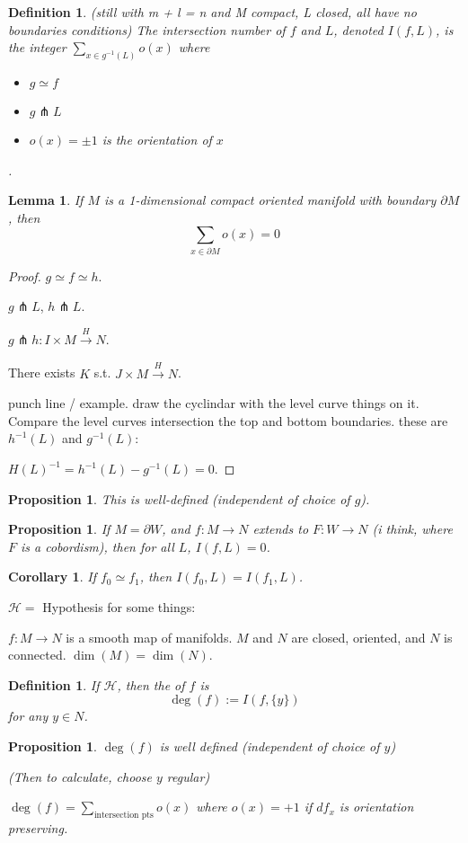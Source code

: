 \documentclass[11pt]{amsbook}
\newenvironment{dateenv}{
	\vspace{1em}
}{
	\vspace{1em}
}
\newcommand{\mydate}[4]{
	\newdate{#1}{#2}{#3}{#4}
	\begin{dateenv}
		\hfill\displaydate{#1}
	\end{dateenv}
}
\theoremstyle{mystyle} \newtheorem{thrm}[thm]{Theorem}
\theoremstyle{mystyle} \newtheorem{defi}[thm]{Definition}
\theoremstyle{mystyle} \newtheorem{coro}[thm]{Corollary}
\theoremstyle{mystyle} \newtheorem{propo}[thm]{Proposition}
\theoremstyle{mystyle} \newtheorem{lemm}[thm]{Lemma}
\numberwithin{thm}{section}
\newcommand{\homotopic}{\simeq}
\renewcommand{\d}{\partial}
\newcommand{\transverse}{\pitchfork}
\newcommand{\x}{\times}
\begin{document}
\begin{defi}
	(still with m + l = n and M compact, L closed, all have no boundaries conditions)
	The \emph{intersection number} of $f$ and $L$, denoted $I(f, L)$, is the integer $\sum_{x \in g^{-1}(L)} o(x)$ where
	\begin{itemize}
		\item $g \homotopic f$
		\item $g \transverse L$
		\item $o(x) = \pm 1$ is the orientation of $x$
	\end{itemize}.
\end{defi}
\begin{lemm}
	If $M$ is a 1-dimensional compact oriented manifold with boundary $\d M$, then $$\sum_{x \in \d M} o(x) = 0$$
\end{lemm}
\begin{proof}
	$g \homotopic f \homotopic h$.

	$g \transverse L$, $h \transverse L$.

	$g \transverse h : I \x M \overset{H}{\to} N$.

	There exists $K$ s.t. $J \x M \overset{\overset{~}{H}}{\to} N$.

	punch line / example.  draw the cyclindar with the level curve things on it.  Compare the level curves intersection the top and bottom boundaries.  these are $h^{-1}(L)$ and $g^{-1}(L)$:

	$\overset{~}{H}(L)^{-1} = h^{-1}(L) - g^{-1}(L) = 0$.
\end{proof}

\mydate{d17}{21}{11}{2016}

\begin{propo}
	This is well-defined (independent of choice of $g$).
\end{propo}
\begin{propo}
	If $M = \d W$, and $f: M \to N$ extends to $F: W \to N$ (i think, where $F$ is a cobordism), then for all $L$, $I(f,L) = 0$.
\end{propo}
\begin{coro}
	If $f_0 \homotopic f_1$, then $I(f_0, L) = I(f_1, L)$.
\end{coro}

$\mathcal{H} = $ Hypothesis for some things:

$f: M \to N$ is a smooth map of manifolds.  $M$ and $N$ are closed, oriented, and $N$  is connected.  $\dim(M) = \dim(N)$.

\begin{defi}
	If $\mathcal{H}$, then the  of $f$ is $$\deg(f) := I(f, \{y\})$$ for any $y \in N$.
\end{defi}
\begin{propo}
	$\deg(f)$ is well defined (independent of choice of $y$)

	(Then to calculate, choose $y$ regular)

	$\deg(f) = \sum_{\text{intersection pts}} o(x)$ where $o(x) = +1$ if $df_x$ is orientation preserving.
\end{propo}
\end{document}
